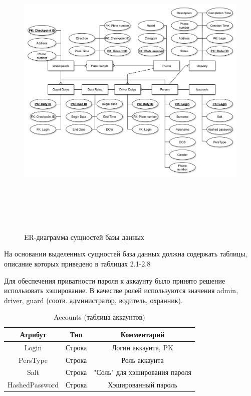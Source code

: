 \begin{figure}[ph!]
	\begin{center}
		{\includegraphics[height=14cm, width = 15cm]{schemes/er_db.pdf}}
		\caption{ER-диаграмма сущностей базы данных}
		\label{er_db}
	\end{center}
\end{figure}

На основании выделенных сущностей база данных должна содержать таблицы, описание которых приведено в таблицах 2.1-2.8

Для обеспечения приватности пароля к аккаунту было принято решение использовать хэширование. В качестве ролей используются значения admin, driver, guard (соотв. администратор, водитель, охранник).
\begin{table}[h] 
	\begin{center}
	\caption{Accounts (таблица аккаунтов)}
	\label{acc_table}
	\begin{tabular}{| c | c | c |}
		\hline
		\textbf{Атрибут}		&	\textbf{Тип}		& \textbf{Комментарий} \\
		\hline
		Login 		&	Строка		&	Логин аккаунта, PK \\ \hline
		PersType 	&	Строка 		&	Роль аккаунта \\ \hline
		Salt 		&	Строка		&	"Соль" для хэширования пароля \\ \hline
		HashedPassword & Строка		&	Хэшированный пароль \\ \hline
	\end{tabular}
	\end{center}
\end{table}

